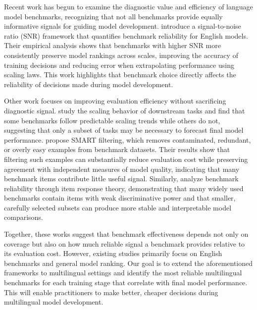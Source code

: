 \documentclass{article}
\begin{document}
Recent work has begun to examine the diagnostic value and efficiency of language model benchmarks, recognizing that not all benchmarks provide equally informative signals for guiding model development. \cite{heineman2025signalnoiseframeworkreducing} introduce a signal-to-noise ratio (SNR) framework that quantifies benchmark reliability for English models. 
Their empirical analysis shows that benchmarks with higher SNR more consistently preserve model rankings across scales, improving the accuracy of training decisions and reducing error when extrapolating performance using scaling laws. This work highlights that benchmark choice directly affects the reliability of decisions made during model development.

Other work focuses on improving evaluation efficiency without sacrificing diagnostic signal. \cite{chen2025scalinglawspredictingdownstream} study the scaling behavior of downstream tasks and find that some benchmarks follow predictable scaling trends while others do not, suggesting that only a subset of tasks may be necessary to forecast final model performance. \cite{gupta-etal-2025-improving-smart} propose SMART filtering, which removes contaminated, redundant, or overly easy examples from benchmark datasets. Their results show that filtering such examples can substantially reduce evaluation cost while preserving agreement with independent measures of model quality, indicating that many benchmark items contribute little useful signal. Similarly, \cite{Zhou_Huang_Zhao_Han_Wang_Chen_Yang_Bao_Dong_Xu_Zhu_Cao_Zhao_2026_lostinbenchmarks} analyze benchmark reliability through item response theory, demonstrating that many widely used benchmarks contain items with weak discriminative power and that smaller, carefully selected subsets can produce more stable and interpretable model comparisons. 

Together, these works suggest that benchmark effectiveness depends not only on coverage but also on how much reliable signal a benchmark provides relative to its evaluation cost. However, existing studies primarily focus on English benchmarks and general model ranking. Our goal is to extend the aforementioned frameworks to multilingual settings and identify the most reliable multilingual benchmarks for each training stage that correlate with final model performance. This will enable practitioners to make better, cheaper decisions during multilingual model development.
\end{document}
